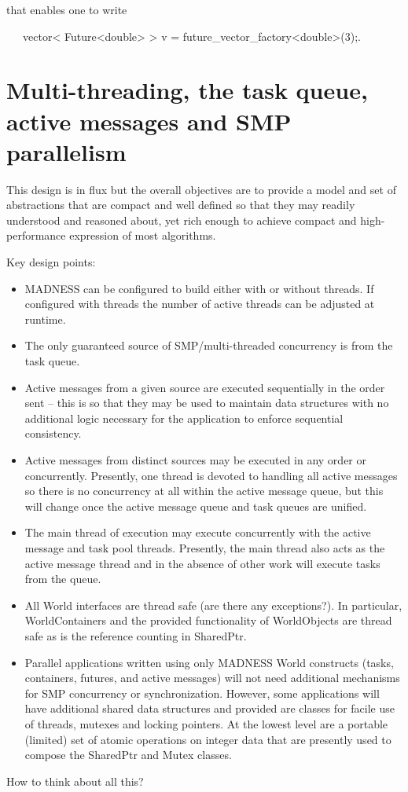 \documentclass[letterpaper]{article}
\newcommand\liststyleLx{%
\renewcommand\labelitemi{${\bullet}$}
\renewcommand\labelitemii{${\circ}$}
\renewcommand\labelitemiii{${\blacksquare}$}
\renewcommand\labelitemiv{${\bullet}$}
}
\begin{document}
that enables one to write

\ \ \ vector{\textless} Future{\textless}double{\textgreater} {\textgreater} v =
future\_vector\_factory{\textless}double{\textgreater}(3);.

\section{Multi-threading, the task queue, active messages and SMP parallelism}
This design is in flux but the overall objectives are to provide a model and set of abstractions that are compact and
well defined so that they may readily understood and reasoned about, yet rich enough to achieve compact and
high-performance expression of most algorithms.

Key design points:

\liststyleLx
\begin{itemize}
\item MADNESS can be configured to build either with or without threads. If configured with threads the number of active
threads can be adjusted at runtime.
\item The only guaranteed source of SMP/multi-threaded concurrency is from the task queue.
\item Active messages from a given source are executed sequentially in the order sent -- this is so that they may be
used to maintain data structures with no additional logic necessary for the application to enforce sequential
consistency.
\item Active messages from distinct sources may be executed in any order or concurrently. Presently, one thread is
devoted to handling all active messages so there is no concurrency at all within the active message queue, but this
will change once the active message queue and task queues are unified.
\item The main thread of execution may execute concurrently with the active message and task pool threads. Presently,
the main thread also acts as the active message thread and in the absence of other work will execute tasks from the
queue.
\item All World interfaces are thread safe (are there any exceptions?). In particular, WorldContainers and the provided
functionality of WorldObjects are thread safe as is the reference counting in SharedPtr.
\item Parallel applications written using only MADNESS World constructs (tasks, containers, futures, and active
messages) will not need additional mechanisms for SMP concurrency or synchronization. However, some applications will
have additional shared data structures and provided are classes for facile use of threads, mutexes and locking
pointers. At the lowest level are a portable (limited) set of atomic operations on integer data that are presently used
to compose the SharedPtr and Mutex classes.
\end{itemize}
How to think about all this?
\end{document}
